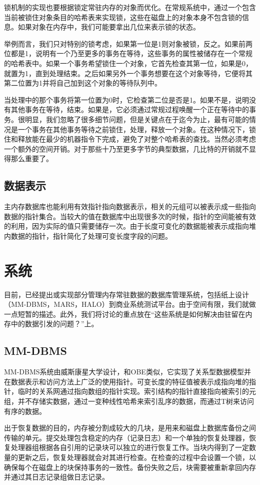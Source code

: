 \documentclass[translation]{zjutreport}
\begin{document}
锁机制的实现也要根据锁定常驻内存的对象而优化。在常规系统中，通过一个包含当前被锁住对象条目的哈希表来实现锁，这些在磁盘上的对象本身不包含锁的信息。如果对象在内存中，我们可能要拿出几位来表示锁的状态。

举例而言，我们只对特别的锁考虑，如果第一位是1则对象被锁，反之。如果前两位都是1，说明有一个乃至更多的事务在等待，这些事务的属性被储存在一个常规的哈希表中。如果一个事务希望锁住一个对象，它首先检查其第一位，如果是0，就置为1，直到处理结束。之后如果另外一个事务想要在这个对象等待，它便将其第二位置为1并将自己加到这个对象的等待队列中。

当处理中的那个事务将第一位置为0时，它检查第二位是否是1。如果不是，说明没有其他事务在等待，结束。如果是，它必须通过常规过程唤醒一个正在等待中的事务。很明显，我们忽略了很多细节问题，但是关键点在于迄今为止，最有可能的情况是一个事务在其他事务等待之前锁住，处理，释放一个对象。在这种情况下，锁住和释放能在最少的机器指令下完成，避免了对整个哈希表的查找。当然必须考虑一个额外的空间开销。对于那些十乃至更多字节的典型数据，几比特的开销就不显得那么重要了。

\section{数据表示}
主内存数据库也能利用有效指针指向数据表示，相关的元组可以被表示成一些指向数据的指针集合。当较大的值在数据库中出现很多次的时候，指针的空间能被有效的利用，因为实际的值只需要储存一次。由于长度可变化的数据能被表示成指向堆内数据的指针，指针简化了处理可变长度字段的问题。

\chapter{系统}
目前，已经提出或实现部分管理内存常驻数据的数据库管理系统，包括纸上设计（MM-DBMS，MARS，HALO）到商业系统测试平台。由于空间有限，我们就做一点短暂的描述。此外，我们将讨论的重点放在“这些系统是如何解决由驻留在内存中的数据引发的问题？”上。

\section{MM-DBMS}
MM-DBMS系统由威斯康星大学设计，和OBE类似，它实现了关系型数据模型并在数据表示和访问方法上广泛的使用指针。可变长度的特征值被表示成指向堆的指针，临时的关系网通过指向数组的指针实现。索引结构的指针直接指向被索引的元组，并不存储实数据，通过一变种线性哈希来索引乱序的数据，而通过T树来访问有序的数据。

出于恢复数据的目的，内存被分割成较大的几块，是用来和磁盘上数据库备份之间传输的单元。提交处理包含稳定的内存（记录日志）和一个单独的恢复处理器，恢复处理器组根据各自引用的记录块可以独立的进行恢复工作。当块内得到了一定数量的更新之后，恢复处理器就会对其进行检查。在检查的过程中会设置一个锁，以确保每个在磁盘上的块保持事务的一致性。备份失败之后，块需要被重新拿回内存并通过其日志记录组做日志记录。
\end{document}
